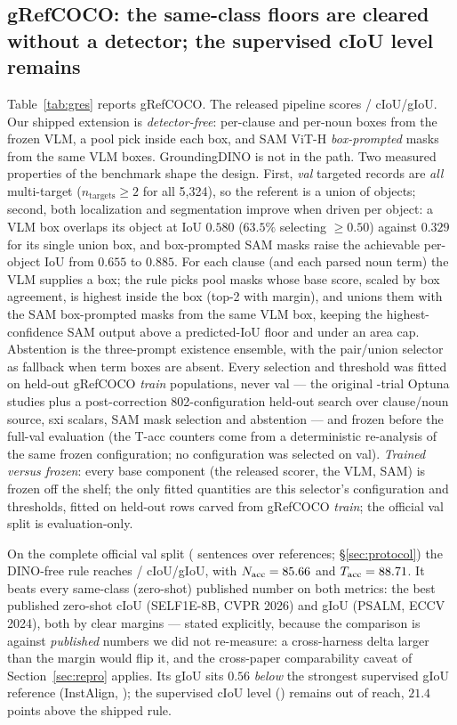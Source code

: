\subsection{gRefCOCO: the same-class floors are cleared without a detector; the supervised cIoU level remains}
\label{sec:gref}
Table~\ref{tab:gres} reports gRefCOCO. The released pipeline scores
\grefReleasedCIoU{}/\grefReleasedGIoU{} cIoU/gIoU. Our shipped extension is
\emph{detector-free}: per-clause and per-noun boxes from the frozen VLM, a
pool pick inside each box, and SAM ViT-H \emph{box-prompted} masks from the
same VLM boxes. GroundingDINO is not in the path. Two measured properties of
the benchmark shape the design. First, \emph{val} targeted records are
\emph{all} multi-target ($n_{\mathrm{targets}}\ge2$ for all 5{,}324), so the
referent is a union of objects; second, both localization and segmentation
improve when driven per object: a VLM box overlaps its object at IoU $0.580$
($63.5\%$ selecting $\ge0.50$) against $0.329$ for its single union box, and
box-prompted SAM masks raise the achievable per-object IoU from $0.655$ to
$0.885$. For each clause (and each parsed noun term) the VLM supplies a box;
the rule picks pool masks whose base score, scaled by box agreement, is
highest inside the box (top-2 with margin), and unions them with the SAM
box-prompted masks from the same VLM box, keeping the highest-confidence SAM
output above a predicted-IoU floor and under an area cap. Abstention is the
three-prompt existence ensemble, with the pair/union selector as fallback when
term boxes are absent. Every selection and threshold was fitted on held-out
gRefCOCO \emph{train} populations, never val --- the original
\grefStudyTrials{}-trial Optuna studies plus a post-correction 802-configuration
held-out search over clause/noun source, sxi scalars, SAM mask selection and
abstention --- and frozen before the full-val evaluation (the T-acc counters come from a
deterministic re-analysis of the same frozen configuration; no configuration
was selected on val).
\emph{Trained versus frozen}: every base component (the released scorer, the
VLM, SAM) is frozen off the shelf; the only fitted quantities are this
selector's configuration and thresholds, fitted on held-out rows carved from
gRefCOCO \emph{train}; the official val split is evaluation-only.

On the complete official val split (\grefN{} sentences over \nGres{}
references; \S\ref{sec:protocol}) the DINO-free rule reaches
\grefCIoU{}/\grefGIoU{} cIoU/gIoU, with
$N_{\mathrm{acc}}=85.66$ and $T_{\mathrm{acc}}=88.71$. It beats
every same-class (zero-shot) published number on both metrics: the best
published zero-shot cIoU \grefZeroShotCIoU{} (SELF1E-8B, CVPR 2026) and gIoU
\grefZeroShotGIoU{} (PSALM, ECCV 2024), both by clear margins --- stated
explicitly, because the comparison is against \emph{published} numbers we did
not re-measure: a cross-harness delta larger than the margin would flip it,
and the cross-paper comparability caveat of Section~\ref{sec:repro} applies.
Its gIoU sits $0.56$ \emph{below} the strongest supervised gIoU reference
(InstAlign, \grefPubGIoU); the supervised cIoU level (\grefPubCIoU) remains out
of reach, $21.4$ points above the shipped rule.

